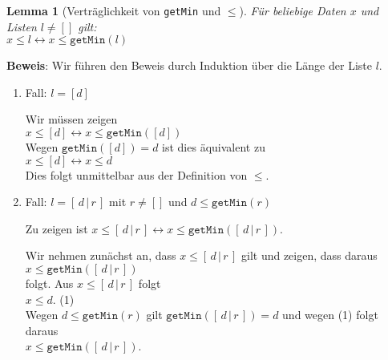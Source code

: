 \documentclass{article}
\newtheorem{Lemma}[Definition]{Lemma}
\begin{document}
\begin{Lemma}[Vertr\"aglichkeit von \texttt{getMin} und $\leq$] \label{l2}
F\"ur beliebige Daten $x$ und Listen $l \not= []$ gilt: \\[0.1cm]
\hspace*{1.3cm} $x \leq l \leftrightarrow x \leq \mathtt{getMin}(l)$
\end{Lemma}
\textbf{Beweis}:  Wir f\"uhren den Beweis durch Induktion \"uber die L\"ange der Liste $l$.
\begin{enumerate}
\item Fall: $l = [d]$
    
      Wir m\"ussen zeigen \\[0.1cm]
      \hspace*{1.3cm} $x \leq [d] \leftrightarrow x \leq \mathtt{getMin}([d])$ \\[0.1cm]
      Wegen $\mathtt{getMin}([d]) = d$ ist dies \"aquivalent zu \\[0.1cm]
      \hspace*{1.3cm} $x \leq [d] \leftrightarrow x \leq d$ \\[0.1cm]
      Dies folgt unmittelbar aus der Definition von $\leq$.
\item Fall: $l = [\,d\,|\,r\,]$ mit $r \not = []$ und $d \leq \mathtt{getMin}(r)$

      Zu zeigen ist $x \leq [\,d\,|\,r\,] \leftrightarrow x \leq \mathtt{getMin}([\,d\,|\,r\,])$.

      Wir nehmen zun\"achst an, dass $x \leq [\,d\,|\,r\,]$ gilt und zeigen, dass daraus \\[0.1cm]
      \hspace*{1.3cm} $x \leq \mathtt{getMin}([\,d\,|\,r\,])$ \\[0.1cm]
      folgt.  Aus $x \leq [\,d\,|\,r\,]$ folgt \\[0.1cm]
      \hspace*{1.3cm} $x \leq d$.   \hspace*{\fill} (1) \\[0.1cm]
      Wegen $d \leq \mathtt{getMin}(r)$ gilt $\mathtt{getMin}([\,d\,|\,r\,]) = d$ und wegen (1)
      folgt daraus \\[0.1cm]
      \hspace*{1.3cm} $x \leq \mathtt{getMin}([\,d\,|\,r\,])$.
     

\end{enumerate}
\end{document}
